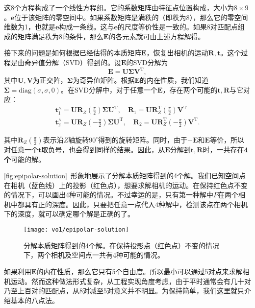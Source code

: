 \clearpage
这8个方程构成了一个线性方程组。它的系数矩阵由特征点位置构成，大小为$8 \times 9$。$\bm{e}$位于该矩阵的零空间中。如果系数矩阵是满秩的（即秩为8），那么它的零空间维数为1，也就是$\bm{e}$构成一条线。这与$\bm{e}$的尺度等价性是一致的。如果8对匹配点组成的矩阵满足秩为8的条件，那么$\bm{E}$的各元素就可由上述方程解得。

接下来的问题是如何根据已经估得的本质矩阵$\bm{E}$，恢复出相机的运动$\bm{R}, \bm{t}$。这个过程是由奇异值分解（SVD）得到的。设$\bm{E}$的SVD分解为
\begin{equation}
\bm{E} = \bm{U} \bm{\Sigma} \bm{V}^\mathrm{T},
\end{equation}
其中$\bm{U}, \bm{V}$为正交阵，$\bm{\Sigma}$为奇异值矩阵。根据$\bm{E}$的内在性质，我们知道$\bm{\Sigma} = \mathrm{diag}( \sigma, \sigma, 0 )$。在SVD分解中，对于任意一个$\bm{E}$，存在两个可能的$\bm{t}, \bm{R}$与它对应：
\begin{equation}
\begin{array}{l}
\bm{t}_1^ \wedge  = \bm{U}{\bm{R}_Z}(\frac{\pi }{2}) \bm{\Sigma} {\bm{U}^\mathrm{T}}, \quad {\bm{R}_1} = \bm{U} \bm{R}_Z^\mathrm{T}(\frac{\pi }{2}){ \bm{V}^\mathrm{T}}\\
\bm{t}_2^ \wedge  = \bm{U}{\bm{R}_Z}( - \frac{\pi }{2})\bm{\Sigma} {\bm{U}^\mathrm{T}}, \quad  {\bm{R}_2} = \bm{U} \bm{R}_Z^\mathrm{T}( - \frac{\pi }{2}){\bm{V}^\mathrm{T}}.
\end{array}
\end{equation}

其中$\bm{R}_Z(\frac{\pi }{2})$表示沿$Z$轴旋转$90^\circ$得到的旋转矩阵。同时，由于$-\bm{E}$和$\bm{E}$等价，所以对任意一个$\bm{t}$取负号，也会得到同样的结果。因此，从$\bm{E}$分解到$\bm{t}, \bm{R}$时，一共存在\textbf{4个}可能的解。

\autoref{fig:epipolar-solution}~形象地展示了分解本质矩阵得到的4个解。我们已知空间点在相机（蓝色线）上的投影（红色点），想要求解相机的运动。在保持红色点不变的情况下，可以画出4种可能的情况。不过幸运的是，只有第一种解中$P$在两个相机中都具有正的深度。因此，只要把任意一点代入4种解中，检测该点在两个相机下的深度，就可以确定哪个解是正确的了。

\begin{figure}[!htp]
	\centering
	\texttt{[image: vo1/epipolar-solution]}
	\caption{分解本质矩阵得到的4个解。在保持投影点（红色点）不变的情况下，两个相机及空间点一共有4种可能的情况。}
	\label{fig:epipolar-solution}
\end{figure}

如果利用$\bm{E}$的内在性质，那么它只有5个自由度。所以最小可以通过5对点来求解相机运动\textsuperscript{\cite{Li2006, Nister2004a}}。然而这种做法形式复杂，从工程实现角度考虑，由于平时通常会有几十对乃至上百对的匹配点，从8对减至5对意义并不明显。为保持简单，我们这里就只介绍基本的八点法。

